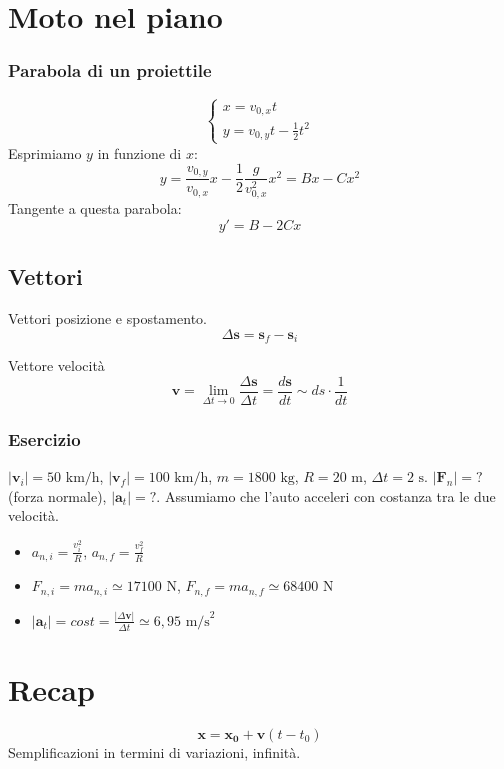 \section*{Moto nel piano}

\subsubsection*{Parabola di un proiettile}
\[
    \begin{cases}
        x = v_{0,x}t\\
        y = v_{0,y}t - \frac{1}{2}t^2
    \end{cases}
\]
Esprimiamo $y$ in funzione di $x$:
\[
    y = \frac{v_{0,y}}{v_{0,x}}x - \frac{1}{2}\frac{g}{v_{0,x}^2}x^2 = Bx - Cx^2
\]
Tangente a questa parabola:
\[
    y' = B - 2Cx
\]

\subsection*{Vettori}
Vettori posizione e spostamento.
\[ \Delta\mathbf{s} = \mathbf{s}_f - \mathbf{s}_i \]

Vettore velocità
\[ \mathbf{v} = \lim_{\Delta t \to 0}\frac{\Delta\mathbf{s}}{\Delta t} = \frac{d\mathbf{s}}{dt} \sim ds\cdot\frac{1}{dt} \]


\subsubsection*{Esercizio}
$|\mathbf{v}_i| = 50\text{ km/h}$, $|\mathbf{v}_f| = 100\text{ km/h}$,
$m = 1800\text{ kg}$, $R = 20\text{ m}$, $\Delta t = 2\text{ s}$. $|\mathbf{F}_n| = ?$ (forza normale),
$|\mathbf{a}_t| = ?$. Assumiamo che l'auto acceleri con costanza tra le
due velocità.

\begin{itemize}
    \item $a_{n,i} = \frac{v_i^2}{R}$, $a_{n,f} = \frac{v_f^2}{R}$
    \item $F_{n,i} = ma_{n,i} \simeq 17100 \text{ N}$, $F_{n,f} = ma_{n,f} \simeq 68400\text{ N}$
    \item $|\mathbf{a}_t| = \textit{cost} = \frac{|\Delta\mathbf{v}|}{\Delta t} \simeq 6,95\text{ m/s}^2$
\end{itemize}

\section*{Recap}
\[ \mathbf{x} = \mathbf{x_0} + \mathbf{v}(t - t_0) \]
Semplificazioni in termini di variazioni, infinità.
